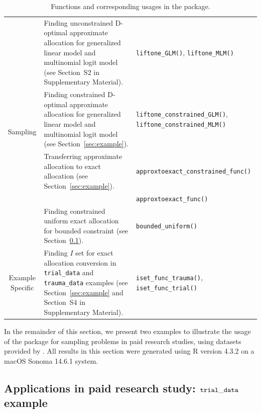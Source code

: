 \begin{table}[htb!]
\begin{tabularx}{\textwidth}{c|b|m}
\multirow[c]{5}{*}{Sampling} & Finding unconstrained D-optimal approximate allocation for generalized linear model and multinomial logit model (see Section~S2 in Supplementary Material). & \texttt{liftone\_GLM()}, \texttt{liftone\_MLM()}\\
                        & Finding constrained D-optimal approximate allocation for generalized linear model and multinomial logit model (see Section~\ref{sec:example}). & \texttt{liftone\_constrained\_GLM()}, \texttt{liftone\_constrained\_MLM()}\\
                        & Transferring approximate allocation to exact allocation (see Section~\ref{sec:example}). & \texttt{approxtoexact\_constrained\_func()}\\
                        &                                                   & \texttt{approxtoexact\_func()}\\
                        & Finding constrained uniform exact allocation for bounded constraint (see Section~\ref{sec:example_glm}). & \texttt{bounded\_uniform()}\\\hline
\multirow[c]{1}{*}{Example Specific} & Finding $I$ set for exact allocation conversion in \texttt{trial\_data} and \texttt{trauma\_data} examples (see Section~\ref{sec:example} and Section~S4 in Supplementary Material). & \texttt{iset\_func\_trauma()}, \texttt{iset\_func\_trial()}\\\bottomrule
\end{tabularx}
\caption{Functions and corresponding usages in the  package.}\label{Tab:summary_functions}
\end{table}

In the remainder of this section, we present two examples to illustrate the usage of the  package for sampling problems in paid research studies, using datasets provided by . All results in this section were generated using R version 4.3.2 on a macOS Sonoma 14.6.1 system.

\subsection{Applications in paid research study: $\tt trial\_data$ example}\label{sec:example_glm}

